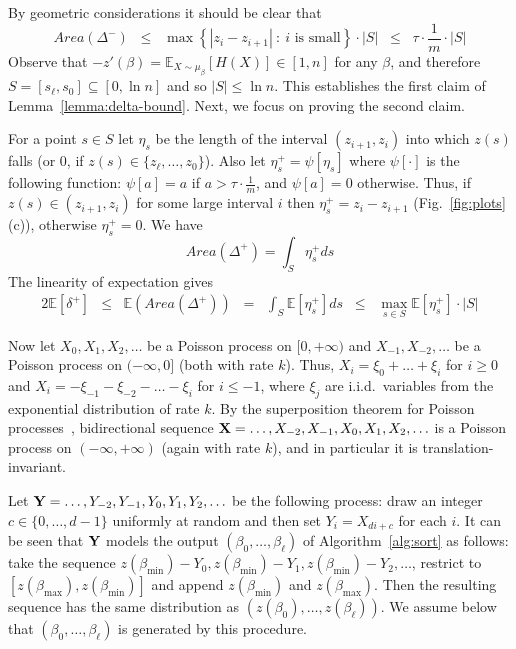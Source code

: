 \documentclass[final,12pt]{colt2018}
\def\bmin{{\beta_{\min}}}
\def\bmax{{\beta_{\max}}}
\def\E{{\mathbb E}}
\begin{document}
By geometric considerations it should be clear that 
$$
Area(\Delta^-)
\;\;\le\;\;  \max\left\{|z_i-z_{i+1}|\::\:\mbox{$i$ is small}\right\}\cdot|S|
\;\;\le\;\; \tau\cdot\mbox{$\frac{1}{m}$}\cdot|S|
$$
Observe that  $-z'(\beta)=\E_{X\sim \mu_\beta}[H(X)]\in[1,n]$ for any $\beta$, and therefore $S=[s_\ell,s_0]\subseteq[0,\ln n]$
and so $|S|\le\ln n$.
This establishes the first claim of Lemma~\ref{lemma:delta-bound}. Next, we focus on proving the second claim.

For a point $s\in S$ let $\eta_s$ be the length of the interval $(z_{i+1},z_i)$
into which $z(s)$ falls (or $0$, if $z(s)\in\{z_\ell,\ldots,z_0\}$).
Also let  $\eta^+_s=\psi[\eta_s]$ where $\psi[\cdot]$ is the following function:
 $\psi[a]=a$ if $a>\tau\cdot \frac{1}m$, and $\psi[a]=0$ otherwise.
Thus, if $z(s)\in(z_{i+1},z_i)$ for some large interval $i$ then $\eta^+_s=z_{i}-z_{i+1}$ 
 (Fig.~\ref{fig:plots}(c)),
otherwise $\eta^+_s=0$.
We have
$$
Area(\Delta^+)
=\int_{S}\eta^+_sds
$$
The linearity of expectation  gives
\begin{eqnarray}
2\E[\delta^+] 
&\le& \E(Area(\Delta^+))
\;\;=\;\; \int_{S} \E[\eta^+_s]ds 
\;\;\le\;\; \max_{s\in S}\E[\eta^+_s]\cdot |S|
\label{eq:expectation-linearity}
\end{eqnarray}

Now let $X_0,X_1,X_2,\ldots$ be a Poisson process on $[0,+\infty)$
and $X_{-1},X_{-2},\ldots$ be a Poisson process on $(-\infty,0]$ (both with rate $k$).
Thus, 
$X_i=\xi_0+\ldots+\xi_{i}$ for $i\ge 0$
and 
 $X_i=-\xi_{-1}-\xi_{-2}-\ldots-\xi_{i}$ for $i\le -1$, where $\xi_j$ are i.i.d.\ variables from the exponential distribution of rate $k$.
By the superposition theorem for Poisson processes~\cite[page 16]{Kingman:PPP},
bidirectional sequence  ${\bf X}=\ldots,X_{-2},X_{-1},X_0,X_1,X_2,\ldots$ 
is a Poisson process  on $(-\infty,+\infty)$ (again with rate $k$),
and in particular it is translation-invariant.

Let ${\bf Y}=\ldots,Y_{-2},Y_{-1},Y_0,Y_1,Y_2,\ldots$ be the following process:
draw an integer $c\in\mbox{$\{0,\ldots,d-1\}$}$ uniformly at random and
then set $Y_i=X_{di+c}$ for each $i$.
It can be seen that  ${\bf Y}$ models 
the output $(\beta_0,\ldots,\beta_\ell)$ of Algorithm~\ref{alg:sort} as follows: 
take the sequence $z(\bmin)-Y_0,z(\bmin)-Y_1,z(\bmin)-Y_2,\ldots$,
restrict to $[z(\bmax),z(\bmin)]$ and  append $z(\bmin)$ and $z(\bmax)$.
Then the resulting sequence has the same distribution as $(z(\beta_0),\ldots,z(\beta_\ell))$.
We assume below that $(\beta_0,\ldots,\beta_\ell)$
is generated by this procedure.
\end{document}
